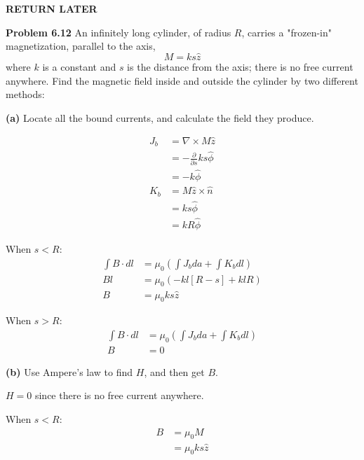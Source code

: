 \documentclass{article}
\begin{document}
\textbf{RETURN LATER}

\textbf{Problem 6.12}
An infinitely long cylinder, of radius $R$, carries a "frozen-in" magnetization, parallel to the axis,
$$M = ks \hat{z}$$
where $k$ is a constant and $s$ is the distance from the axis; there is no free current anywhere.
Find the magnetic field inside and outside the cylinder by two different methods:

\textbf{(a)}
Locate all the bound currents, and calculate the field they produce.

\begin{equation*}
\begin{split}
	J_b & = \nabla \times M \hat{z} \\
	& = - \frac{\partial}{\partial s} k s \hat{\phi} \\
	& = - k \hat{\phi} \\
	K_b & = M \hat{z} \times \hat{n} \\
	& = k s \hat{\phi} \\
	& = k R \hat{\phi}
\end{split}
\end{equation*}

When $s < R$:
\begin{equation*}
\begin{split}
	\int B \cdot dl & = \mu_0 (\int J_b da + \int K_b dl) \\
	B l & = \mu_0 (- k l [R - s] + k l R) \\
	B & = \boxed{\mu_0 k s \hat{z}}
\end{split}
\end{equation*}

When $s > R$:
\begin{equation*}
\begin{split}
	\int B \cdot dl & = \mu_0 (\int J_b da + \int K_b dl) \\
	B & = \boxed{0}
\end{split}
\end{equation*}

\textbf{(b)}
Use Ampere's law to find $H$, and then get $B$.

$H = 0$ since there is no free current anywhere.

When $s < R$:
\begin{equation*}
\begin{split}
	B & = \mu_0 M \\
	& = \boxed{\mu_0 k s \hat{z}}
\end{split}
\end{equation*}
\end{document}
